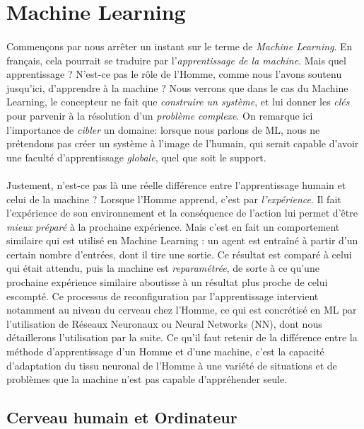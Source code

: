 \section{Machine Learning}

\paragraph{} Commençons par nous arrêter un instant sur le terme de \emph{Machine Learning}. En français,
cela pourrait se traduire par l'\emph{apprentissage de la machine}. Mais quel apprentissage ? N'est-ce pas
le rôle de l'Homme, comme nous l'avons soutenu jusqu'ici, d'apprendre à la machine ? Nous verrons que dans
le cas du Machine Learning, le concepteur ne fait que \emph{construire un système}, et lui donner
les \emph{clés} pour parvenir à la résolution d'un \emph{problème complexe}. On remarque ici l'importance
de \emph{cibler} un domaine: lorsque nous parlons de ML, nous ne prétendons pas créer un système à l'image
de l'humain, qui serait capable d'avoir une faculté d'apprentissage \emph{globale}, quel que soit le support. 

\paragraph{} Justement, n'est-ce pas là une réelle différence entre l'apprentissage humain et celui de la machine ?
Lorsque l'Homme apprend, c'est par \emph{l'expérience}. Il fait l'expérience de son environnement et la
conséquence de l'action lui permet d'être \emph{mieux préparé} à la prochaine expérience. Mais c'est en fait un
comportement similaire qui est utilisé en Machine Learning : un agent est entraîné à partir d'un certain nombre
d'entrées, dont il tire une sortie. Ce résultat est comparé à celui qui était attendu, puis la machine est
\emph{reparamétrée}, de sorte à ce qu'une prochaine expérience similaire aboutisse à un résultat plus proche 
de celui escompté. Ce processus de reconfiguration par l'apprentissage intervient notamment au niveau du cerveau
chez l'Homme, ce qui est concrétisé en ML par l'utilisation de Réseaux Neuronaux ou Neural Networks (NN), dont
nous détaillerons l'utilisation par la suite. Ce qu'il faut retenir de la différence entre la méthode d'apprentissage
d'un Homme et d'une machine, c'est la capacité d'adaptation du tissu neuronal de l'Homme à une variété de situations
et de problèmes que la machine n'est pas capable d'appréhender seule.


\subsection*{Cerveau humain et Ordinateur}

